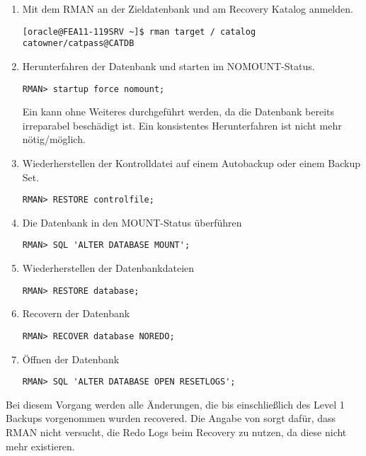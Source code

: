         \begin{enumerate}
          \item Mit dem RMAN an der Zieldatenbank und am Recovery Katalog anmelden.
            \begin{lstlisting}[caption={An der Zieldatenbank und am Recovery Katalog anmelden},label=admin1531,language=rman]
[oracle@FEA11-119SRV ~]$ rman target / catalog catowner/catpass@CATDB
            \end{lstlisting}
          \item Herunterfahren der Datenbank und starten im NOMOUNT-Status.
            \begin{lstlisting}[caption={Shutdown und Mounten},label=admin1532,language=rman,alsolanguage=sqlplus]
RMAN> startup force nomount;
            \end{lstlisting}
            Ein  kann ohne Weiteres durchgeführt werden, da die Datenbank bereits irreparabel beschädigt ist. Ein konsistentes Herunterfahren ist nicht mehr nötig/möglich.
          \item Wiederherstellen der Kontrolldatei auf einem Autobackup oder einem Backup Set.
            \begin{lstlisting}[caption={Kontrolldatei wiederherstellen},label=admin1533,language=rman]
RMAN> RESTORE controlfile;
            \end{lstlisting}
          \item Die Datenbank in den MOUNT-Status überführen
            \begin{lstlisting}[caption={MOUNT-Status erreichen},label=admin1534,language=rman,emph={[9]ALTER, DATABASE,MOUNT},emphstyle={[9]\color{magenta}\bfseries}]
RMAN> SQL 'ALTER DATABASE MOUNT';
            \end{lstlisting}
          \item Wiederherstellen der Datenbankdateien
            \begin{lstlisting}[caption={Datenbankdateien wiederherstellen},label=admin1535,language=rman]
RMAN> RESTORE database;
            \end{lstlisting}
          \item Recovern der Datenbank
            \begin{lstlisting}[caption={Datenbankdateien wiederherstellen},label=admin1536,language=rman]
RMAN> RECOVER database NOREDO;
            \end{lstlisting}
          \item Öffnen der Datenbank
            \begin{lstlisting}[caption={Datenbank mit open resetlogs öffnen},label=admin1537,language=rman,emph={[9]ALTER,DATABASE,OPEN,RESETLOGS},emphstyle={[9]\color{magenta}\bfseries}]
RMAN> SQL 'ALTER DATABASE OPEN RESETLOGS';
            \end{lstlisting}
        \end{enumerate}
        Bei diesem Vorgang werden alle Änderungen, die bis einschließlich des Level 1 Backups vorgenommen wurden recovered. Die Angabe von  sorgt dafür, dass RMAN nicht versucht, die Redo Logs beim Recovery zu nutzen, da diese nicht mehr existieren.

